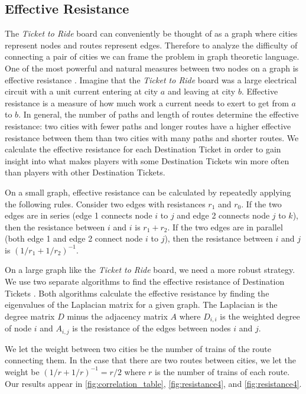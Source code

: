 \begin{multicols}{2}
\subsection{Effective Resistance}
The \textit{Ticket to Ride} board can conveniently
be thought of as a graph where cities represent
nodes and routes represent edges.
Therefore to analyze the difficulty of connecting a
pair of cities we can frame the problem in graph theoretic language.
One of the most powerful and natural measures
between two nodes on a graph is effective resistance
\cite{ellens2011effective}.
Imagine that the \textit{Ticket to Ride} board was
a large electrical circuit with a unit current
entering at city $a$ and leaving at city $b$.
Effective resistance is a measure
of how much work a current needs to exert
to get from $a$ to $b$.
In general, the number of paths and length of routes 
determine the effective resistance:
two cities with fewer paths and longer routes
have a higher effective resistance between them
than two cities with many paths and shorter routes.
We calculate the effective resistance for each 
Destination Ticket in order to gain insight
into what makes players with some Destination Tickets
win more often than players with other Destination Tickets.

On a small graph, effective resistance can be calculated
by repeatedly applying the following rules.
Consider two edges with resistances $r_1$ and $r_0$.
If the two edges are in series (edge 1 connects node $i$ to $j$
and edge 2 connects node $j$ to $k$), then the resistance between
$i$ and $i$ is $r_1 + r_2$.
If the two edges are in parallel (both edge 1 and edge 2 connect
node $i$ to $j$), then the resistance between $i$ and $j$
is $(1/r_1 + 1/r_2)^{-1}$.

On a large graph like the \textit{Ticket to Ride} board, 
we need a more robust strategy.
We use two separate algorithms to find the effective resistance
of Destination Tickets
\cite{ellens2011effective, wu2004theory}.
Both algorithms calculate the effective resistance by finding 
the eigenvalues of the Laplacian matrix for a given graph.
The Laplacian is the degree matrix $D$ minus the adjacency
matrix $A$ where $D_{i,i}$ is the weighted degree of node $i$
and $A_{i,j}$ is the resistance of the edges between nodes
$i$ and $j$.

We let the weight between two cities be the number
of trains of the route connecting them.
In the case that there are two routes between cities,
we let the weight be $(1/r + 1/r)^{-1}=r/2$ where
$r$ is the number of trains of each route.
Our results appear in \cref{fig:correlation_table},
\cref{fig:resistance4}, and \cref{fig:resistance4}.

\end{multicols}

